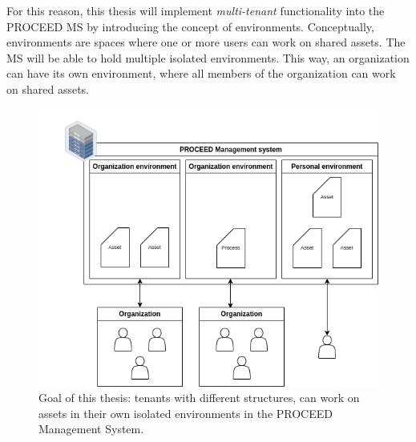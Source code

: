 For this reason, this thesis will implement \textit{multi-tenant} functionality into the PROCEED MS by introducing the concept of environments.
Conceptually, environments are spaces where one or more users can work on shared assets.
The MS will be able to hold multiple isolated environments.
This way, an organization can have its own environment, where all members of the
organization can work on shared assets.


\begin{figure}[h]
	\centering
	\includegraphics[scale=0.45]{images/proceed-workspaces-v2.drawio.png}
	\caption{Goal of this thesis: tenants with different structures, can work on assets in their own isolated environments in
		the PROCEED Management System.}
\end{figure}
\FloatBarrier

